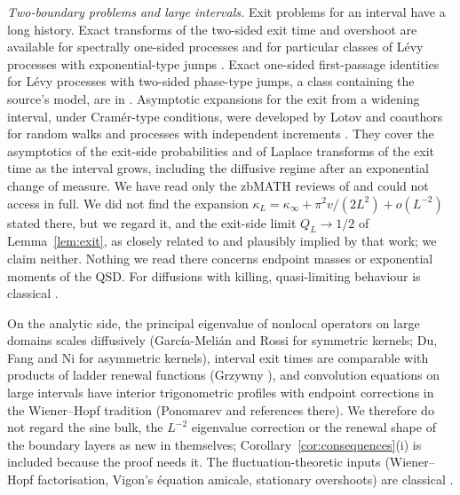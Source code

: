 \documentclass[11pt,a4paper]{article}
\theoremstyle{definition}
\theoremstyle{remark}
\newcommand{\1}{\mathbf 1}
\newcommand{\kinf}{\kappa_\infty}
\begin{document}
\emph{Two-boundary problems and large intervals.} Exit problems for an interval have a long history. Exact transforms of the two-sided exit time and overshoot are available for spectrally one-sided processes \cite{bertoin97,lambert} and for particular classes of L\'evy processes with exponential-type jumps \cite{kadver}. Exact one-sided first-passage identities for L\'evy processes with two-sided phase-type jumps, a class containing the source's model, are in \cite{aap}. Asymptotic expansions for the exit from a widening interval, under Cram\'er-type conditions, were developed by Lotov and coauthors for random walks and processes with independent increments \cite{lotov79,lotovkh,lotov16,khodzhibaev14}. They cover the asymptotics of the exit-side probabilities and of Laplace transforms of the exit time as the interval grows, including the diffusive regime after an exponential change of measure. We have read only the zbMATH reviews of \cite{lotovkh,khodzhibaev14} and could not access \cite{lotov79,lotov16} in full. We did not find the expansion $\kappa_L=\kinf+\pi^2v/(2L^2)+o(L^{-2})$ stated there, but we regard it, and the exit-side limit $Q_L\to1/2$ of Lemma~\ref{lem:exit}, as closely related to and plausibly implied by that work; we claim neither. Nothing we read there concerns endpoint masses or exponential moments of the QSD. For diffusions with killing, quasi-limiting behaviour is classical \cite{mandl,kolbst}.

On the analytic side, the principal eigenvalue of nonlocal operators on large domains scales diffusively (Garc\'ia-Meli\'an and Rossi \cite{garciarossi} for symmetric kernels; Du, Fang and Ni \cite{du} for asymmetric kernels), interval exit times are comparable with products of ladder renewal functions (Grzywny \cite{grzywny}), and convolution equations on large intervals have interior trigonometric profiles with endpoint corrections in the Wiener--Hopf tradition (Ponomarev \cite{ponomarev} and references there). We therefore do not regard the sine bulk, the $L^{-2}$ eigenvalue correction or the renewal shape of the boundary layers as new in themselves; Corollary~\ref{cor:consequences}(i) is included because the proof needs it. The fluctuation-theoretic inputs (Wiener--Hopf factorisation, Vigon's \'equation amicale, stationary overshoots) are classical \cite{bertoinbook,doney,kyprianoubook,vigon,bvhs,doring}.
\end{document}
